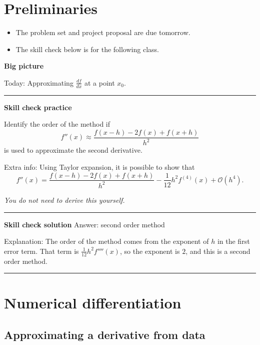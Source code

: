 \documentclass[12pt,letterpaper,noanswers]{exam}
\begin{document}
 \pdfpageheight 11in 
  \pdfpagewidth 8.5in

\noindent 

\section*{Preliminaries}

\begin{itemize}
\itemsep0pt
\item The problem set and project proposal are due tomorrow.
\item The skill check below is for the following class.
\end{itemize}


\noindent\textbf{Big picture}

Today: Approximating $\frac{df}{dx}$ at a point $x_0$.

\vspace{0.2cm}
\hrule
\vspace{0.2cm}

\noindent \textbf{Skill check practice}

Identify the order of the method if 
\[f''(x) \approx \dfrac{f(x-h)-2f(x)+f(x+h)}{h^2}\]
is used to approximate the second derivative.

\noindent Extra info: Using Taylor expansion, it is possible to show that \[f''(x) = \dfrac{f(x-h)-2f(x)+f(x+h)}{h^2} - \frac{1}{12}h^2 f^{(4)}(x) + \mathcal{O}(h^4).\]

\emph{You do not need to derive this yourself.}


\vspace{0.2cm}
\hrule
\vspace{0.2cm}

\noindent \textbf{Skill check solution}
Answer: second order method

Explanation: The order of the method comes from the exponent of $h$ in the first error term.  That term is $\frac{1}{12}h^2f''''(x)$, so the exponent is $2$, and this is a second order method.

\vspace{0.2cm}
\hrule
\vspace{0.2cm}


\section*{Numerical differentiation}


\subsection*{Approximating a derivative from data}
\end{document}
